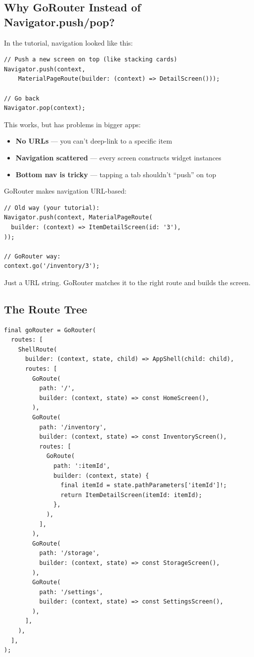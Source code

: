 \documentclass[11pt, a4paper]{article}
\begin{document}
\subsection{Why GoRouter Instead of Navigator.push/pop?}

\begin{comparisonbox}
In the tutorial, navigation looked like this:

\begin{lstlisting}[numbers=none]
// Push a new screen on top (like stacking cards)
Navigator.push(context,
    MaterialPageRoute(builder: (context) => DetailScreen()));

// Go back
Navigator.pop(context);
\end{lstlisting}

This works, but has problems in bigger apps:
\begin{itemize}
    \item \textbf{No URLs} --- you can't deep-link to a specific item
    \item \textbf{Navigation scattered} --- every screen constructs widget instances
    \item \textbf{Bottom nav is tricky} --- tapping a tab shouldn't ``push'' on top
\end{itemize}

GoRouter makes navigation URL-based:

\begin{lstlisting}[numbers=none]
// Old way (your tutorial):
Navigator.push(context, MaterialPageRoute(
  builder: (context) => ItemDetailScreen(id: '3'),
));

// GoRouter way:
context.go('/inventory/3');
\end{lstlisting}

Just a URL string. GoRouter matches it to the right route and builds the screen.
\end{comparisonbox}

\subsection{The Route Tree}

\begin{lstlisting}
final goRouter = GoRouter(
  routes: [
    ShellRoute(
      builder: (context, state, child) => AppShell(child: child),
      routes: [
        GoRoute(
          path: '/',
          builder: (context, state) => const HomeScreen(),
        ),
        GoRoute(
          path: '/inventory',
          builder: (context, state) => const InventoryScreen(),
          routes: [
            GoRoute(
              path: ':itemId',
              builder: (context, state) {
                final itemId = state.pathParameters['itemId']!;
                return ItemDetailScreen(itemId: itemId);
              },
            ),
          ],
        ),
        GoRoute(
          path: '/storage',
          builder: (context, state) => const StorageScreen(),
        ),
        GoRoute(
          path: '/settings',
          builder: (context, state) => const SettingsScreen(),
        ),
      ],
    ),
  ],
);
\end{lstlisting}
\end{document}
